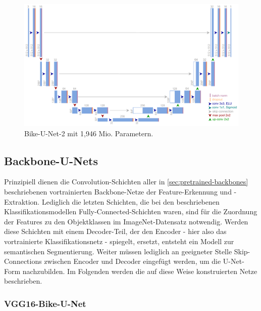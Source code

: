 \begin{figure}
	\centering
	\includegraphics[width=1.\textwidth]{Bilder/own-unet-2mil.pdf} 
	\caption{Bike-U-Net-2 mit 1,946 Mio. Parametern.}
	\label{fig:bike-unet-2}
\end{figure} 


\subsection{Backbone-U-Nets}

Prinzipiell dienen die Convolution-Schichten aller in \autoref{sec:pretrained-backbones} beschriebenen vortrainierten Backbone-Netze 
der Feature-Erkennung und -Extraktion. Lediglich die letzten Schichten, die bei den beschriebenen Klassifikationsmodellen  
Fully-Connected-Schichten waren, sind für die Zuordnung der Features zu den Objektklassen 
im ImageNet-Datensatz notwendig. Werden diese Schichten mit einem Decoder-Teil, der den Encoder - hier 
also das vortrainierte Klassifikationsnetz - spiegelt, ersetzt, entsteht ein Modell zur semantischen Segmentierung. 
Weiter müssen lediglich an geeigneter Stelle Skip-Connections zwischen Encoder und Decoder eingefügt werden,
um die U-Net-Form nachzubilden. Im Folgenden werden die auf diese Weise konstruierten Netze beschrieben. 

\subsubsection{VGG16-Bike-U-Net}

